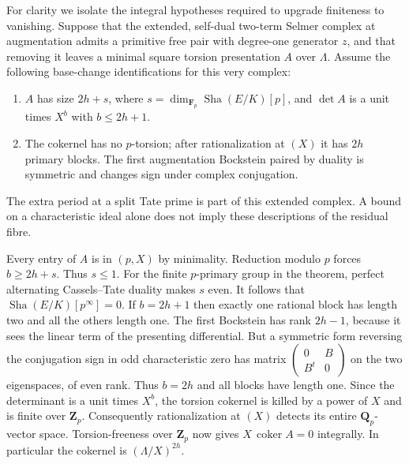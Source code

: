\documentclass[11pt]{article}
\newcommand{\Z}{\mathbf Z}
\newcommand{\Q}{\mathbf Q}
\newcommand{\F}{\mathbf F}
\begin{document}
For clarity we isolate the integral hypotheses required to upgrade
finiteness to vanishing. Suppose that the extended, self-dual
two-term Selmer complex at augmentation admits a primitive free pair
with degree-one generator $z$, and that removing it leaves a minimal
square torsion presentation $A$ over $\Lambda$. Assume the following
base-change identifications for this very complex:
\begin{enumerate}
\item $A$ has size $2h+s$, where
$s=\dim_{\F_p}\operatorname{Sha}(E/K)[p]$, and
$\det A$ is a unit times $X^b$ with $b\le2h+1$.
\item The cokernel has no $p$-torsion; after rationalization at $(X)$
it has $2h$ primary blocks. The first augmentation Bockstein paired
by duality is symmetric and changes sign under complex conjugation.
\end{enumerate}
The extra period at a split Tate prime is part of this extended
complex. A bound on a characteristic ideal alone does not imply
these descriptions of the residual fibre.

Every entry of $A$ is in $(p,X)$ by minimality. Reduction modulo $p$
forces $b\ge 2h+s$. Thus $s\le1$. For the finite $p$-primary group
in the theorem, perfect alternating Cassels--Tate duality makes $s$
even. It follows that $\operatorname{Sha}(E/K)[p^\infty]=0$.
If $b=2h+1$ then exactly one rational block has length two and all
the others length one. The first Bockstein has rank $2h-1$, because
it sees the linear term of the presenting differential. But a symmetric
form reversing the conjugation sign in odd characteristic zero has
matrix $\left(\begin{smallmatrix}0&B\\B^t&0\end{smallmatrix}\right)$
on the two eigenspaces, of even rank. Thus $b=2h$ and all blocks have
length one. Since the determinant is a unit times $X^b$, the torsion
cokernel is killed by a power of $X$ and is finite over $\Z_p$.
Consequently rationalization at $(X)$ detects its entire
$\Q_p$-vector space. Torsion-freeness over $\Z_p$ now gives
$X\,\operatorname{coker} A=0$ integrally. In particular the cokernel
is $(\Lambda/X)^{2h}$.
\end{document}
